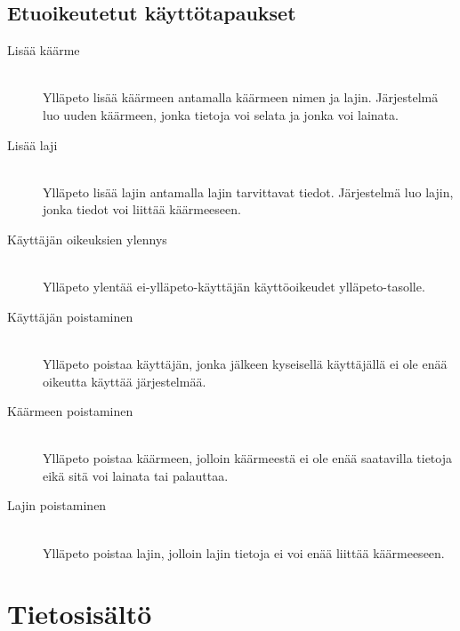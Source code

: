 \documentclass[11pt]{article}
\begin{document}
\subsection{Etuoikeutetut käyttötapaukset}

\begin{description}
\item[Lisää käärme] \hfill \\
Ylläpeto lisää käärmeen antamalla käärmeen nimen ja lajin. Järjestelmä luo uuden käärmeen, jonka tietoja voi selata ja jonka voi lainata.
\item[Lisää laji] \hfill \\
Ylläpeto lisää lajin antamalla lajin tarvittavat tiedot. Järjestelmä luo lajin, jonka tiedot voi liittää käärmeeseen.
\item[Käyttäjän oikeuksien ylennys] \hfill \\
Ylläpeto ylentää ei-ylläpeto-käyttäjän käyttöoikeudet ylläpeto-tasolle.
\item[Käyttäjän poistaminen] \hfill \\
Ylläpeto poistaa käyttäjän, jonka jälkeen kyseisellä käyttäjällä ei ole enää oikeutta käyttää järjestelmää.
\item[Käärmeen poistaminen] \hfill \\
Ylläpeto poistaa käärmeen, jolloin käärmeestä ei ole enää saatavilla tietoja eikä sitä voi lainata tai palauttaa.
\item[Lajin poistaminen] \hfill \\
Ylläpeto poistaa lajin, jolloin lajin tietoja ei voi enää liittää käärmeeseen.
\end{description}

\section{Tietosisältö}

\subsection{}

\paragraph{}

\section{}
\subsection{}
\paragraph{}
\end{document}
